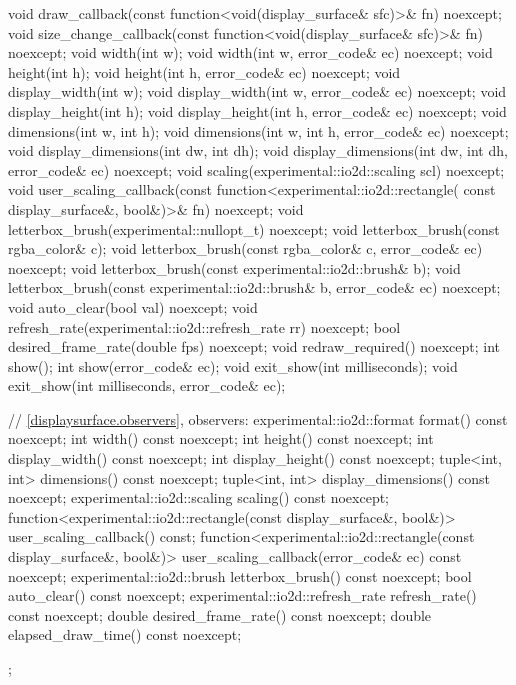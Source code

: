 \begin{codeblock}
{{{{{    void draw_callback(const function<void(display_surface& sfc)>& fn) noexcept;
    void size_change_callback(const function<void(display_surface& sfc)>& fn)
      noexcept;
    void width(int w);
    void width(int w, error_code& ec) noexcept;
    void height(int h);
    void height(int h, error_code& ec) noexcept;
    void display_width(int w);
    void display_width(int w, error_code& ec) noexcept;
    void display_height(int h);
    void display_height(int h, error_code& ec) noexcept;
    void dimensions(int w, int h);
    void dimensions(int w, int h, error_code& ec) noexcept;
    void display_dimensions(int dw, int dh);
    void display_dimensions(int dw, int dh, error_code& ec) noexcept;
    void scaling(experimental::io2d::scaling scl) noexcept;
    void user_scaling_callback(const function<experimental::io2d::rectangle(
      const display_surface&, bool&)>& fn) noexcept;
    void letterbox_brush(experimental::nullopt_t) noexcept;
    void letterbox_brush(const rgba_color& c);
    void letterbox_brush(const rgba_color& c, error_code& ec) noexcept;
    void letterbox_brush(const experimental::io2d::brush& b);
    void letterbox_brush(const experimental::io2d::brush& b, error_code& ec) 
      noexcept;
    void auto_clear(bool val) noexcept;
    void refresh_rate(experimental::io2d::refresh_rate rr) noexcept;
    bool desired_frame_rate(double fps) noexcept;
    void redraw_required() noexcept;
    int show();
    int show(error_code& ec);
    void exit_show(int milliseconds);
    void exit_show(int milliseconds, error_code& ec);
    
    // \ref{displaysurface.observers}, observers:
    experimental::io2d::format format() const noexcept;
    int width() const noexcept;
    int height() const noexcept;
    int display_width() const noexcept;
    int display_height() const noexcept;
    tuple<int, int> dimensions() const noexcept;
    tuple<int, int> display_dimensions() const noexcept;
    experimental::io2d::scaling scaling() const noexcept;
    function<experimental::io2d::rectangle(const display_surface&,
      bool&)> user_scaling_callback() const;
    function<experimental::io2d::rectangle(const display_surface&,
      bool&)> user_scaling_callback(error_code& ec) const noexcept;
    experimental::io2d::brush letterbox_brush() const noexcept;
    bool auto_clear() const noexcept;
    experimental::io2d::refresh_rate refresh_rate() const noexcept;
    double desired_frame_rate() const noexcept;
    double elapsed_draw_time() const noexcept;
  };
} } } }
\end{codeblock}

